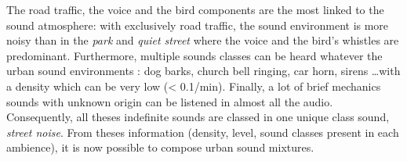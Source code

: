 \documentclass[a4,11pt,twocolumn]{article}
\begin{document}
%
%

The road traffic, the voice and the bird components are the most linked to the sound atmosphere: with exclusively road traffic, the sound environment is more noisy than in the \textit{park} and \textit{quiet street} where the voice and the bird's whistles are predominant. Furthermore, multiple sounds classes can be heard whatever the urban sound environments : dog barks, church bell ringing, car horn, sirens \dots with a density which can be very low (< 0.1/min). Finally, a lot of brief mechanics sounds with unknown origin can be listened in almost all the audio. Consequently, all theses indefinite sounds are classed in one unique class sound, \textit{street noise}. From theses information (density, level, sound classes present in each ambience), it is now possible to compose urban sound mixtures.
\end{document}
